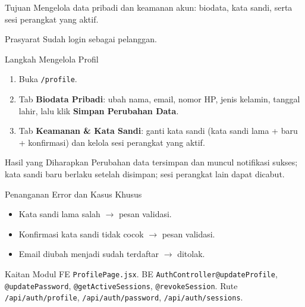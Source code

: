 
\begin{flowsection}{Tujuan}
Mengelola data pribadi dan keamanan akun: biodata, kata sandi, serta sesi
perangkat yang aktif.
\end{flowsection}

\begin{flowsection}{Prasyarat}
Sudah login sebagai pelanggan.
\end{flowsection}

\begin{flowsection}{Langkah Mengelola Profil}
\begin{enumerate}
  \item Buka \texttt{/profile}.
  \item Tab \textbf{Biodata Pribadi}: ubah nama, email, nomor HP, jenis kelamin,
        tanggal lahir, lalu klik \textbf{Simpan Perubahan Data}.
  \item Tab \textbf{Keamanan \& Kata Sandi}: ganti kata sandi (kata sandi lama +
        baru + konfirmasi) dan kelola sesi perangkat yang aktif.
\end{enumerate}
\end{flowsection}



\begin{flowsection}{Hasil yang Diharapkan}
Perubahan data tersimpan dan muncul notifikasi sukses; kata sandi baru berlaku
setelah disimpan; sesi perangkat lain dapat dicabut.
\end{flowsection}

\begin{flowsection}{Penanganan Error dan Kasus Khusus}
\begin{itemize}
  \item Kata sandi lama salah $\rightarrow$ pesan validasi.
  \item Konfirmasi kata sandi tidak cocok $\rightarrow$ pesan validasi.
  \item Email diubah menjadi sudah terdaftar $\rightarrow$ ditolak.
\end{itemize}
\end{flowsection}

\begin{flowsection}{Kaitan Modul}
FE \texttt{ProfilePage.jsx}. BE \texttt{AuthController@updateProfile},
\texttt{@updatePassword}, \texttt{@getActiveSessions}, \texttt{@revokeSession}.
Rute \texttt{/api/auth/profile}, \texttt{/api/auth/password}, \texttt{/api/auth/sessions}.
\end{flowsection}


